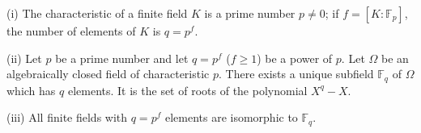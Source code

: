 (i) The characteristic of a finite field $K$ is a prime number $p \neq 0$; if $f = [K:\mathbb{F}_p]$, the number of elements of $K$ is $q = p^f$.

(ii) Let $p$ be a prime number and let $q = p^f$ ($f \geq 1$) be a power of $p$. Let $\Omega$ be an algebraically closed field of characteristic $p$. There exists a unique subfield $\mathbb{F}_q$ of $\Omega$ which has $q$ elements. It is the set of roots of the polynomial $X^q - X$.

(iii) All finite fields with $q = p^f$ elements are isomorphic to $\mathbb{F}_q$.
